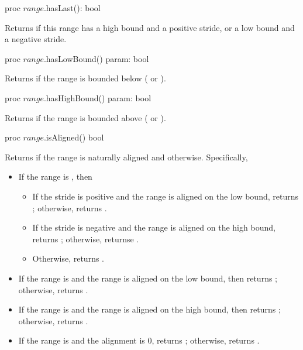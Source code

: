 \begin{protohead}
proc $range$.hasLast(): bool
\end{protohead}
\begin{protobody}
Returns  if this range has a high bound and a positive stride, or a low
bound and a negative stride.
\end{protobody}

\begin{protohead}
proc $range$.hasLowBound() param: bool
\end{protohead}
\begin{protobody}
Returns  if the range is bounded below ( or ).
\end{protobody}

\begin{protohead}
proc $range$.hasHighBound() param: bool
\end{protohead}
\begin{protobody}
Returns  if the range is bounded above ( or ).
\end{protobody}

\begin{protohead}
proc $range$.isAligned() bool
\end{protohead}
\begin{protobody}
Returns  if the range is naturally aligned and  otherwise.
Specifically,
\begin{itemize}
\item If the range is , then
\begin{itemize}
\item If the stride is positive and the range is aligned on the low bound,
returns ; otherwise, returns .
\item If the stride is negative and the range is aligned on the high bound,
returns ; otherwise, returnse .
\item Otherwise, returns .
\end{itemize}
\item If the range is  and the range is aligned on the low
bound, then returns ; otherwise, returns .
\item If the range is  and the range is aligned on the high
bound, then returns ; otherwise, returns .
\item If the range is  and the alignment is 0, returns ;
otherwise, returns .
\end{itemize}
\end{protobody}


